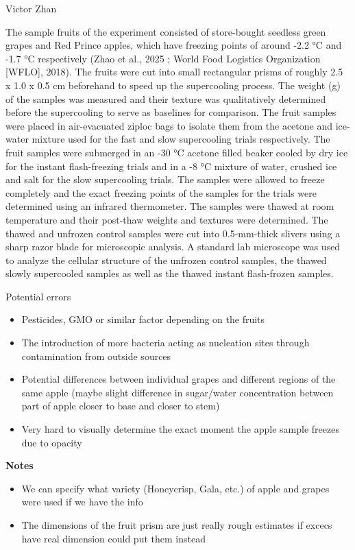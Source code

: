 Victor Zhan

The sample fruits of the experiment consisted of store-bought seedless
green grapes and Red Prince apples, which have freezing points of around
-2.2 °C and -1.7 °C respectively (Zhao et al., 2025 ; World Food
Logistics Organization {[}WFLO{]}, 2018). The fruits were cut into small
rectangular prisms of roughly 2.5 x 1.0 x 0.5 cm beforehand to speed up
the supercooling process. The weight (g) of the samples was measured and
their texture was qualitatively determined before the supercooling to
serve as baselines for comparison. The fruit samples were placed in
air-evacuated ziploc bags to isolate them from the acetone and ice-water
mixture used for the fast and slow supercooling trials respectively. The
fruit samples were submerged in an -30 °C acetone filled beaker cooled
by dry ice for the instant flash-freezing trials and in a -8 °C mixture
of water, crushed ice and salt for the slow supercooling trials. The
samples were allowed to freeze completely and the exact freezing points
of the samples for the trials were determined using an infrared
thermometer. The samples were thawed at room temperature and their
post-thaw weights and textures were determined. The thawed and unfrozen
control samples were cut into 0.5-mm-thick slivers using a sharp razor
blade for microscopic analysis. A standard lab microscope was used to
analyze the cellular structure of the unfrozen control samples, the
thawed slowly supercooled samples as well as the thawed instant
flash-frozen samples.

Potential errors

\begin{itemize}
\item
  Pesticides, GMO or similar factor depending on the fruits
\item
  The introduction of more bacteria acting as nucleation sites through
  contamination from outside sources
\item
  Potential differences between individual grapes and different regions
  of the same apple (maybe slight difference in sugar/water
  concentration between part of apple closer to base and closer to stem)
\item
  Very hard to visually determine the exact moment the apple sample
  freezes due to opacity
\end{itemize}

\textbf{Notes}

\begin{itemize}
\item
  We can specify what variety (Honeycrisp, Gala, etc.) of apple and
  grapes were used if we have the info
\item
  The dimensions of the fruit prism are just really rough estimates if
  excecs have real dimension could put them instead
\end{itemize}

